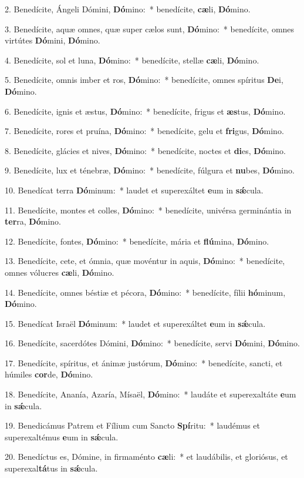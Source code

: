 
2. Benedícite, Ángeli Dómini, \textbf{Dó}mino:~* benedícite, \textbf{cæ}li, \textbf{Dó}mino.

3. Benedícite, aquæ omnes, quæ super cælos sunt, \textbf{Dó}mino:~* benedícite, omnes virtútes \textbf{Dó}mini, \textbf{Dó}mino.

4. Benedícite, sol et luna, \textbf{Dó}mino:~* benedícite, stellæ \textbf{cæ}li, \textbf{Dó}mino.

5. Benedícite, omnis imber et ros, \textbf{Dó}mino:~* benedícite, omnes spíritus \textbf{De}i, \textbf{Dó}mino.

6. Benedícite, ignis et æstus, \textbf{Dó}mino:~* benedícite, frigus et \textbf{æs}tus, \textbf{Dó}mino.

7. Benedícite, rores et pruína, \textbf{Dó}mino:~* benedícite, gelu et \textbf{fri}gus, \textbf{Dó}mino.

8. Benedícite, glácies et nives, \textbf{Dó}mino:~* benedícite, noctes et \textbf{di}es, \textbf{Dó}mino.

9. Benedícite, lux et ténebræ, \textbf{Dó}mino:~* benedícite, fúlgura et \textbf{nu}bes, \textbf{Dó}mino.

10. Benedícat terra \textbf{Dó}minum:~* laudet et superexáltet \textbf{e}um in \textbf{s\'{\ae}}cula.

11. Benedícite, montes et colles, \textbf{Dó}mino:~* benedícite, univérsa germinántia in \textbf{ter}ra, \textbf{Dó}mino.

12. Benedícite, fontes, \textbf{Dó}mino:~* benedícite, mária et \textbf{flú}mina, \textbf{Dó}mino.

13. Benedícite, cete, et ómnia, quæ movéntur in aquis, \textbf{Dó}mino:~* benedícite, omnes vólucres \textbf{cæ}li, \textbf{Dó}mino.

14. Benedícite, omnes béstiæ et pécora, \textbf{Dó}mino:~* benedícite, fílii \textbf{hó}minum, \textbf{Dó}mino.

15. Benedícat Israël \textbf{Dó}minum:~* laudet et superexáltet \textbf{e}um in \textbf{s\'{\ae}}cula.

16. Benedícite, sacerdótes Dómini, \textbf{Dó}mino:~* benedícite, servi \textbf{Dó}mini, \textbf{Dó}mino.

17. Benedícite, spíritus, et ánimæ justórum, \textbf{Dó}mino:~* benedícite, sancti, et húmiles \textbf{cor}de, \textbf{Dó}mino.

18. Benedícite, Ananía, Azaría, Mísaël, \textbf{Dó}mino:~* laudáte et superexaltáte \textbf{e}um in \textbf{s\'{\ae}}cula.

19. Benedicámus Patrem et Fílium cum Sancto \textbf{Spí}ritu:~* laudémus et superexaltémus \textbf{e}um in \textbf{s\'{\ae}}cula.

20. Benedíctus es, Dómine, in firmaménto \textbf{cæ}li:~* et laudábilis, et gloriósus, et superexal\textbf{tá}tus in \textbf{s\'{\ae}}cula.